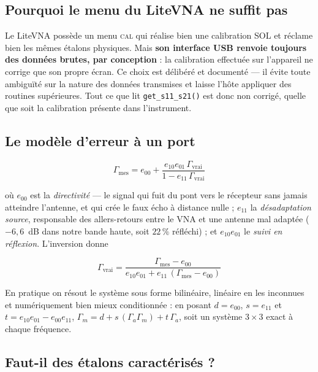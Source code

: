 \documentclass[11pt,a4paper]{article}
\begin{document}
\subsection{Pourquoi le menu du LiteVNA ne suffit pas}

Le LiteVNA possède un menu \textsc{cal} qui réalise bien une calibration SOL et
réclame bien les mêmes étalons physiques. Mais \textbf{son interface USB renvoie
toujours des données brutes, par conception} : la calibration effectuée sur
l'appareil ne corrige que son propre écran. Ce choix est délibéré et documenté
--- il évite toute ambiguïté sur la nature des données transmises et laisse
l'hôte appliquer des routines supérieures. Tout ce que lit
\texttt{get\_s11\_s21()} est donc non corrigé, quelle que soit la calibration
présente dans l'instrument.

\subsection{Le modèle d'erreur à un port}

\begin{equation}
\Gamma_{\text{mes}} = e_{00}
  + \frac{e_{10}e_{01}\,\Gamma_{\text{vrai}}}{1 - e_{11}\,\Gamma_{\text{vrai}}}
\label{eq:oneport}
\end{equation}

où $e_{00}$ est la \emph{directivité} --- le signal qui fuit du pont vers le
récepteur sans jamais atteindre l'antenne, et qui crée le faux écho à distance
nulle ; $e_{11}$ la \emph{désadaptation source}, responsable des allers-retours
entre le VNA et une antenne mal adaptée ($-6{,}6$~dB dans notre bande haute,
soit $22\,\%$ réfléchi) ; et $e_{10}e_{01}$ le \emph{suivi en réflexion}.
L'inversion donne

\begin{equation}
\Gamma_{\text{vrai}} = \frac{\Gamma_{\text{mes}} - e_{00}}
     {e_{10}e_{01} + e_{11}\,(\Gamma_{\text{mes}} - e_{00})}
\end{equation}

En pratique on résout le système sous forme bilinéaire, linéaire en les
inconnues et numériquement bien mieux conditionnée : en posant $d = e_{00}$,
$s = e_{11}$ et $t = e_{10}e_{01} - e_{00}e_{11}$,
$\Gamma_m = d + s\,(\Gamma_a\Gamma_m) + t\,\Gamma_a$, soit un système
$3\times3$ exact à chaque fréquence.

\subsection{Faut-il des étalons caractérisés ?}
\end{document}
